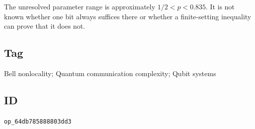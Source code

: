 The unresolved parameter range is approximately $1/2<p<0.835$.  It is not
known whether one bit always suffices there or whether a finite-setting
inequality can prove that it does not.

\subsection*{Tag}

Bell nonlocality; Quantum communication complexity; Qubit systems

\subsection*{ID}

\texttt{op\_64db785888803dd3}
